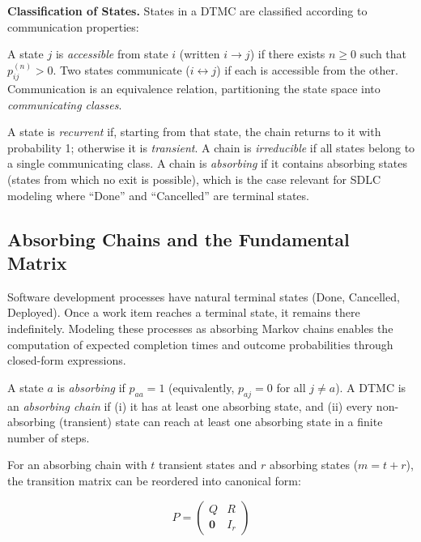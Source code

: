 \textbf{Classification of States.} States in a DTMC are classified according
to communication properties:

A state $j$ is \emph{accessible} from state $i$ (written $i \rightarrow j$)
if there exists $n \geq 0$ such that $p_{ij}^{(n)} > 0$. Two states
communicate ($i \leftrightarrow j$) if each is accessible from the other.
Communication is an equivalence relation, partitioning the state space
into \emph{communicating classes}.

A state is \emph{recurrent} if, starting from that state, the chain returns
to it with probability 1; otherwise it is \emph{transient}. A chain is
\emph{irreducible} if all states belong to a single communicating class.
A chain is \emph{absorbing} if it contains absorbing states (states from
which no exit is possible), which is the case relevant for SDLC modeling
where ``Done'' and ``Cancelled'' are terminal states.


\subsection{Absorbing Chains and the Fundamental Matrix}
\label{sec:absorbing-chains}

Software development processes have natural terminal states (Done,
Cancelled, Deployed). Once a work item reaches a terminal state, it
remains there indefinitely. Modeling these processes as absorbing Markov
chains enables the computation of expected completion times and outcome
probabilities through closed-form expressions.

\begin{definition}
\label{def:absorbing}
A state $a$ is \emph{absorbing} if $p_{aa} = 1$ (equivalently, $p_{aj} = 0$
for all $j \neq a$). A DTMC is an \emph{absorbing chain} if (i) it has at
least one absorbing state, and (ii) every non-absorbing (transient) state
can reach at least one absorbing state in a finite number of steps.
\end{definition}

For an absorbing chain with $t$ transient states and $r$ absorbing states
($m = t + r$), the transition matrix can be reordered into canonical form:

\begin{equation}
\label{eq:absorbing-form}
P = \begin{pmatrix} Q & R \\ \mathbf{0} & I_r \end{pmatrix}
\end{equation}

